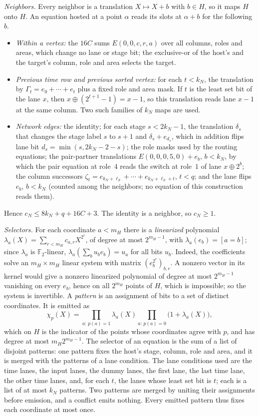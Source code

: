 \emph{Neighbors.} Every neighbor is a translation \(X\mapsto X+b\) with
\(b\in H\), so it maps \(H\) onto \(H\). An equation hosted at a point
\(\alpha\) reads its slots at \(\alpha+b\) for the following \(b\).
\begin{itemize}
\item \emph{Within a vertex:} the \(16C\) sums
\(E(0,0,c,r,a)\) over all columns, roles and areas, which change no
lane or stage bit; the exclusive-or of the host's and the target's
column, role and area selects the target.
\item \emph{Previous time row and previous sorted vertex:} for each
\(t<k_N\), the translation by \(\Gamma_t=e_0+\cdots+e_t\) plus a fixed
role and area mask. If \(t\) is the least set bit of the lane \(x\), then
\(x\oplus(2^{t+1}-1)=x-1\), so this translation reads lane \(x-1\) at
the same column. Two such families of \(k_N\) maps are used.
\item \emph{Network edges:} the identity; for each stage \(s<2k_N-1\),
the translation \(\delta_s\) that changes the stage label \(s\) to
\(s+1\) and \(\delta_s+e_{d_s}\), which in addition flips lane bit
\(d_s=\min(s,2k_N-2-s)\); the role masks used by the routing equations;
the pair-partner translations \(E(0,0,0,5,0)+e_b\), \(b<k_N\), by which
the pair equation at role~\(4\) reads the switch at role~\(1\) of lane
\(x\oplus2^b\); the column successors \(\zeta_t=e_{k_N+\ell_S}+\cdots+e_{k_N+\ell_S+t}\),
\(t<q\); and the lane flips \(e_b\), \(b<k_N\) (counted among the neighbors; no equation of this construction reads them).
\end{itemize}
Hence \(c_N\le8k_N+q+16C+3\). The identity is a neighbor, so
\(c_N\ge1\).

\emph{Selectors.} For each coordinate \(a<m_H\) there is a
\emph{linearized} polynomial
\(\lambda_a(X)=\sum_{r<m_H}c_{a,r}X^{2^r}\), of degree at most
\(2^{m_H-1}\), with \(\lambda_a(e_b)=[a=b]\); since \(\lambda_a\) is
\(\mathbb F_2\)-linear, \(\lambda_a(\sum_bu_be_b)=u_a\) for all bits
\(u_b\). Indeed, the coefficients solve an \(m_H\times m_H\) linear
system with matrix \((e_b^{2^r})_{b,r}\). A nonzero vector in its kernel
would give a nonzero linearized polynomial of degree at most
\(2^{m_H-1}\) vanishing on every \(e_b\), hence on all \(2^{m_H}\) points
of \(H\), which is impossible; so the system is invertible. A
\emph{pattern} is an assignment of bits to a set of distinct
coordinates. It is emitted as
\[
 \chi_p(X)=\prod_{a:\,p(a)=1}\lambda_a(X)\prod_{a:\,p(a)=0}
 \bigl(1+\lambda_a(X)\bigr),
\]
which on \(H\) is the indicator of the points whose coordinates agree
with \(p\), and has degree at most \(m_H2^{m_H-1}\). The selector of an
equation is the sum of a list of disjoint patterns: one pattern fixes
the host's stage, column, role and area, and it is merged with the
patterns of a lane condition. The lane conditions used are the time
lanes, the input lanes, the dummy lanes, the first lane, the last time
lane, the other time lanes, and, for each \(t\), the lanes whose least
set bit is \(t\); each is a list of at most \(k_N\) patterns. Two patterns
are merged by uniting their assignments before emission, and a conflict
emits nothing. Every emitted pattern thus fixes each coordinate at most
once.

